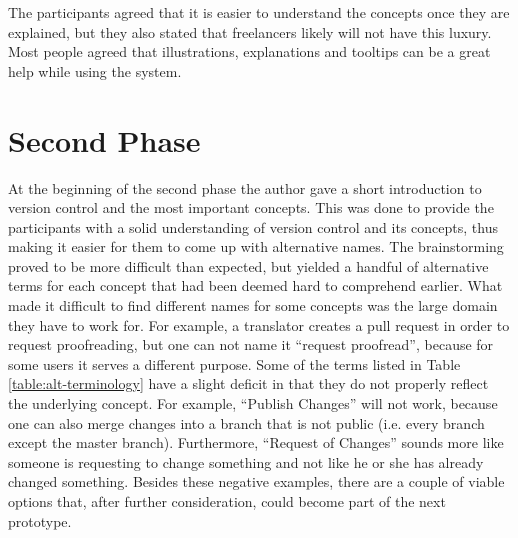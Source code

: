 The participants agreed that it is easier to understand the concepts once they are explained, but they also stated that freelancers likely will not have this luxury. Most people agreed that illustrations, explanations and tooltips can be a great help while using the system.


\section{Second Phase}
At the beginning of the second phase the author gave a short introduction to version control and the most important concepts. This was done to provide the participants with a solid understanding of version control and its concepts, thus making it easier for them to come up with alternative names. The brainstorming proved to be more difficult than expected, but yielded a handful of alternative terms for each concept that had been deemed hard to comprehend earlier. What made it difficult to find different names for some concepts was the large domain they have to work for. For example, a translator creates a pull request in order to request proofreading, but one can not name it “request proofread”, because for some users it serves a different purpose. Some of the terms listed in Table \ref{table:alt-terminology} have a slight deficit in that they do not properly reflect the underlying concept. For example, “Publish Changes” will not work, because one can also merge changes into a branch that is not public (i.e. every branch except the master branch). Furthermore, “Request of Changes” sounds more like someone is requesting to change something and not like he or she has already changed something. Besides these negative examples, there are a couple of viable options that, after further consideration, could become part of the next prototype.

